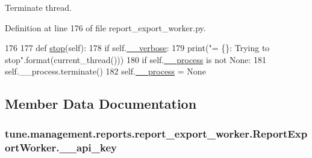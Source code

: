 Terminate thread. 



Definition at line 176 of file report\-\_\-export\-\_\-worker.\-py.


\begin{DoxyCode}
176 
177     \textcolor{keyword}{def }\hyperlink{classtune_1_1management_1_1reports_1_1report__export__worker_1_1ReportExportWorker_a448cbf72ff829120b72294d038025548}{stop}(self):
178         \textcolor{keywordflow}{if} self.\hyperlink{classtune_1_1management_1_1reports_1_1report__export__worker_1_1ReportExportWorker_a06a086d2025a26d725ed44f0d3340c7a}{\_\_verbose}:
179             print(\textcolor{stringliteral}{"= \{\}: Trying to stop"}.format(current\_thread()))
180         \textcolor{keywordflow}{if} self.\hyperlink{classtune_1_1management_1_1reports_1_1report__export__worker_1_1ReportExportWorker_afbdedb366ee3e00378979a90bac67bb8}{\_\_process} \textcolor{keywordflow}{is} \textcolor{keywordflow}{not} \textcolor{keywordtype}{None}:
181             self.\_\_process.terminate()
182             self.\hyperlink{classtune_1_1management_1_1reports_1_1report__export__worker_1_1ReportExportWorker_afbdedb366ee3e00378979a90bac67bb8}{\_\_process} = \textcolor{keywordtype}{None}

\end{DoxyCode}


\subsection{Member Data Documentation}
\hypertarget{classtune_1_1management_1_1reports_1_1report__export__worker_1_1ReportExportWorker_af497eaf63b74b36fb52c624c4cd3ed69}{
\subsubsection[{\-\_\-\-\_\-api\-\_\-key}]{\setlength{\rightskip}{0pt plus 5cm}tune.\-management.\-reports.\-report\-\_\-export\-\_\-worker.\-Report\-Export\-Worker.\-\_\-\-\_\-api\-\_\-key\hspace{0.3cm}{\ttfamily [private]}}}\label{classtune_1_1management_1_1reports_1_1report__export__worker_1_1ReportExportWorker_af497eaf63b74b36fb52c624c4cd3ed69}



